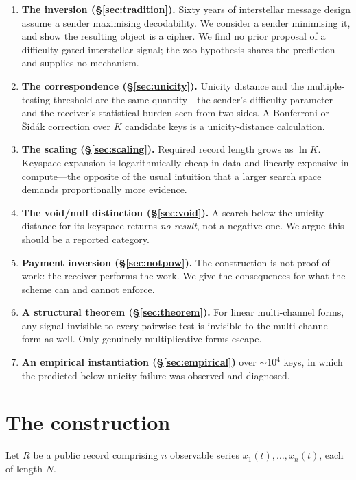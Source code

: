 \begin{enumerate}
  \item \textbf{The inversion (\S\ref{sec:tradition}).} Sixty years of
    interstellar message design assume a sender maximising decodability. We
    consider a sender minimising it, and show the resulting object is a cipher.
    We find no prior proposal of a difficulty-gated interstellar signal; the zoo
    hypothesis shares the prediction and supplies no mechanism.
  \item \textbf{The correspondence (\S\ref{sec:unicity}).} Unicity distance and
    the multiple-testing threshold are the same quantity---the sender's
    difficulty parameter and the receiver's statistical burden seen from two
    sides. A Bonferroni or \v{S}id\'ak correction over $K$ candidate keys is a
    unicity-distance calculation.
  \item \textbf{The scaling (\S\ref{sec:scaling}).} Required record length grows
    as $\ln K$. Keyspace expansion is logarithmically cheap in data and linearly
    expensive in compute---the opposite of the usual intuition that a larger
    search space demands proportionally more evidence.
  \item \textbf{The void/null distinction (\S\ref{sec:void}).} A search below the
    unicity distance for its keyspace returns \emph{no result}, not a negative
    one. We argue this should be a reported category.
  \item \textbf{Payment inversion (\S\ref{sec:notpow}).} The construction is not
    proof-of-work: the receiver performs the work. We give the consequences for
    what the scheme can and cannot enforce.
  \item \textbf{A structural theorem (\S\ref{sec:theorem}).} For linear
    multi-channel forms, any signal invisible to every pairwise test is invisible
    to the multi-channel form as well. Only genuinely multiplicative forms escape.
  \item \textbf{An empirical instantiation (\S\ref{sec:empirical})} over
    ${\sim}10^4$ keys, in which the predicted below-unicity failure was observed
    and diagnosed.
\end{enumerate}

\section{The construction}\label{sec:construction}

Let $R$ be a public record comprising $n$ observable series
$x_1(t),\dots,x_n(t)$, each of length $N$.

